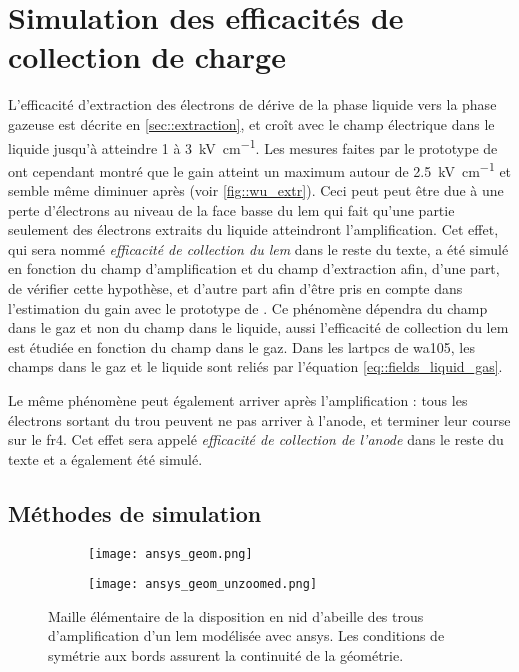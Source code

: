   \section{Simulation des efficacités de collection de charge}\label{sec::efficacites}
    
    L'efficacité d'extraction des électrons de dérive de la phase liquide vers la phase gazeuse est décrite en \autoref{sec::extraction}, et croît avec le champ électrique dans le liquide jusqu'à atteindre 1 à \SI{3}{\kilo\volt\per\centi\meter}. Les mesures faites par le prototype de \threeL{} ont cependant montré que le gain atteint un maximum autour de \SI{2.5}{\kilo\volt\per\centi\meter} et semble même diminuer après\cite{Wu2017} (voir \autoref{fig::wu_extr}). Ceci peut peut être due à une perte d'électrons au niveau de la face basse du \gls{lem} qui fait qu'une partie seulement des électrons extraits du liquide atteindront l'amplification. Cet effet, qui sera nommé \textit{efficacité de collection du \gls{lem}} dans le reste du texte, a été simulé en fonction du champ d'amplification et du champ d'extraction afin, d'une part, de vérifier cette hypothèse, et d'autre part afin d'être pris en compte dans l'estimation du gain avec le prototype de \TOO{}. Ce phénomène dépendra du champ dans le gaz et non du champ dans le liquide, aussi l'efficacité de collection du \gls{lem} est étudiée en fonction du champ dans le gaz. Dans les \glspl{lartpc} de \gls{wa105}, les champs dans le gaz et le liquide sont reliés par l'équation \eqref{eq::fields_liquid_gas}.

    Le même phénomène peut également arriver après l'amplification : tous les électrons sortant du trou peuvent ne pas arriver à l'anode, et terminer leur course sur le \gls{fr4}. Cet effet sera appelé \textit{efficacité de collection de l'anode} dans le reste du texte et a également été simulé.
    
    \subsection{Méthodes de simulation}
        
      \begin{figure}[!htb]
        \begin{subfigure}[t]{0.48\textwidth}
          \texttt{[image: ansys\_geom.png]}
        \end{subfigure}
        \hfill
        \begin{subfigure}[t]{0.48\textwidth}
          \texttt{[image: ansys\_geom\_unzoomed.png]}
        \end{subfigure}
        \caption[Maille élémentaire d'un LEM modélisée avec ANSYS]{\label{fig::ansys_geom}Maille élémentaire de la disposition en nid d'abeille des trous d'amplification d'un \gls{lem} modélisée avec \gls{ansys}. Les conditions de symétrie aux bords assurent la continuité de la géométrie.}
      \end{figure}
            
